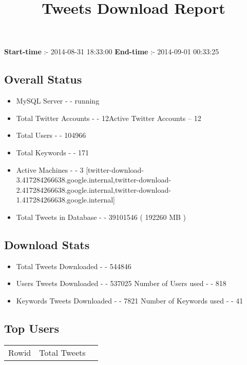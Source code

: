 \documentclass{article}\usepackage[T1]{fontenc}
\begin{document}
\title{\textbf{Tweets Download Report}}
               \date{}
                \maketitle
               \centerline{\textbf{Start-time} :- 2014-08-31 18:33:00 \hspace{40pt} \textbf{End-time} :- 2014-09-01 00:33:25}               \subsection*{Overall Status}                \begin{itemize}                \item MySQL Server - - running               \item Total Twitter Accounts - - 12\newline Active Twitter Accounts -- 12               \item Total Users - - 104966               \item Total Keywords - - 171               \item Active Machines - - 3 [twitter-download-3.417284266638.google.internal,twitter-download-2.417284266638.google.internal,twitter-download-1.417284266638.google.internal]               \item Total Tweets in Database - - 39101546 ( 192260 MB )               \end{itemize}               \subsection*{Download Stats}                \begin{itemize}                \item Total Tweets Downloaded - - 544846               \item Users Tweets Downloaded - - 537025 \newline Number of Users used - - 818               \item Keywords Tweets Downloaded - - 7821 \newline Number of Keywords used - - 41              \end{itemize}              \subsection*{Top Users}\begin{tabular}{|c|c|c|}         \hline         Rowid & Total Tweets \\ 

\end{tabular}
\end{document}
